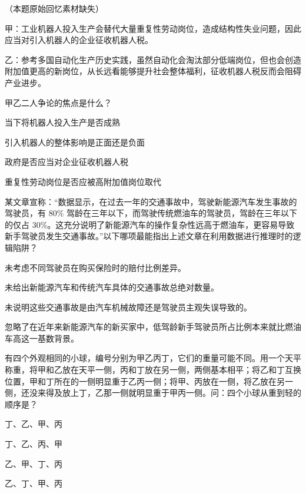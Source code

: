 \documentclass{exam-zh}
\begin{document}
\begin{question}
（本题原始回忆素材缺失）
\end{question}

\begin{question}
甲：工业机器人投入生产会替代大量重复性劳动岗位，造成结构性失业问题，因此应当对引入机器人的企业征收机器人税。

乙：参考多国自动化生产历史实践，虽然自动化会淘汰部分低端岗位，但也会创造附加值更高的新岗位，从长远看能够提升社会整体福利，征收机器人税反而会阻碍产业进步。

甲乙二人争论的焦点是什么？\paren[]
\begin{choices}
  \item 当下将机器人投入生产是否成熟
  \item 引入机器人的整体影响是正面还是负面
  \item 政府是否应当对企业征收机器人税
  \item 重复性劳动岗位是否应被高附加值岗位取代
\end{choices}
\end{question}

\begin{question}
某文章宣称：“数据显示，在过去一年的交通事故中，驾驶新能源汽车发生事故的驾驶员，有 $80\%$ 驾龄在三年以下，而驾驶传统燃油车的驾驶员，驾龄在三年以下的仅占 $30\%$。这充分说明了新能源汽车的操作复杂性远高于燃油车，更容易导致新手驾驶员发生交通事故。”以下哪项最能指出上述文章在利用数据进行推理时的逻辑陷阱？\paren[]
\begin{choices}
  \item 未考虑不同驾驶员在购买保险时的赔付比例差异。
  \item 未给出新能源汽车和传统汽车具体的交通事故总绝对数量。
  \item 未说明这些交通事故是由汽车机械故障还是驾驶员主观失误导致的。
  \item 忽略了在近年来新能源汽车的新买家中，低驾龄新手驾驶员所占比例本来就比燃油车高这一基数背景。
\end{choices}
\end{question}

\begin{question}
有四个外观相同的小球，编号分别为甲乙丙丁，它们的重量可能不同。用一个天平称重，将甲和乙放在天平一侧，丙和丁放在另一侧，两侧基本相平；将乙和丁互换位置，甲和丁所在的一侧明显重于乙丙一侧；将甲、丙放在一侧，将乙放在另一侧，还没来得及放上丁，乙那一侧就明显重于甲丙一侧。问：四个小球从重到轻的顺序是？\paren[]
\begin{choices}
  \item 丁、乙、甲、丙
  \item 丁、乙、丙、甲
  \item 乙、甲、丁、丙
  \item 乙、丁、甲、丙
\end{choices}
\end{question}
\end{document}
